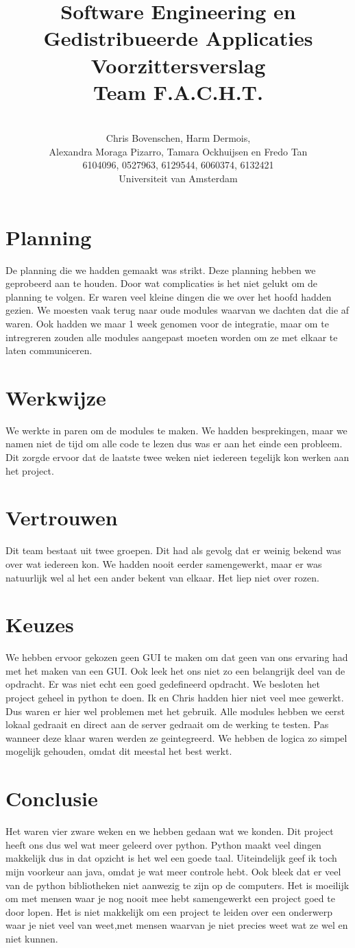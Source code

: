 \documentclass[a4paper,10pt]{article}
\title{Software Engineering en Gedistribueerde Applicaties \\[10pt]Voorzittersverslag\\[25pt]Team F.A.C.H.T.}
\author{\\Chris Bovenschen, Harm Dermois, \\Alexandra Moraga Pizarro, Tamara Ockhuijsen en Fredo Tan \\[10pt]6104096, 0527963, 6129544, 6060374, 6132421 \\[25pt]Universiteit van Amsterdam}
\begin{document}
\maketitle
\newpage
\section{Planning}
De planning die we hadden gemaakt was strikt. Deze planning hebben we geprobeerd aan te houden. Door wat complicaties is het niet gelukt om de planning te volgen. Er waren veel kleine dingen
die we over het hoofd hadden gezien. We moesten vaak terug naar oude modules waarvan we dachten dat die af waren. Ook hadden we maar 1 week genomen voor de integratie, maar om te intregreren zouden alle modules aangepast moeten worden om ze met elkaar te laten communiceren.
\section{Werkwijze}
We werkte in paren om de modules te maken. We hadden besprekingen, maar we namen niet de tijd om alle code te lezen dus was er aan het einde een probleem. Dit zorgde ervoor dat de laatste twee weken niet iedereen tegelijk kon werken aan het project.
\section{Vertrouwen}
Dit team bestaat uit twee groepen. Dit had als gevolg dat er weinig bekend was over wat iedereen kon. We hadden nooit eerder samengewerkt, maar er was natuurlijk wel al het een ander bekent van elkaar. Het liep niet over rozen.
\section{Keuzes}
We hebben ervoor gekozen geen GUI te maken om dat geen van ons ervaring had met het maken van een GUI. Ook leek het ons niet zo een belangrijk deel van de opdracht. Er was niet echt een goed gedefineerd opdracht. 
We besloten het project geheel in python te doen. Ik en Chris hadden hier niet veel mee gewerkt. Dus waren er hier wel problemen met het gebruik.
Alle modules hebben we eerst lokaal gedraait en direct aan de server gedraait om de werking te testen. Pas wanneer deze klaar waren werden ze geintegreerd.
We hebben de logica zo simpel mogelijk gehouden, omdat dit meestal het best werkt.
\section{Conclusie}
Het waren vier zware weken en we hebben gedaan wat we konden. 
Dit project heeft ons dus wel wat meer geleerd over python. Python maakt veel dingen makkelijk dus in dat opzicht is het wel een goede taal. Uiteindelijk geef ik toch mijn voorkeur aan java, omdat je wat meer controle hebt. Ook bleek dat er veel van de python
bibliotheken niet aanwezig te zijn op de computers.
Het is moeilijk om met mensen waar je nog nooit mee hebt samengewerkt een project goed te door lopen. Het is niet makkelijk om een project te leiden over een onderwerp waar je niet veel van weet,met mensen waarvan je niet precies weet wat ze wel en niet kunnen.
\end{document}
